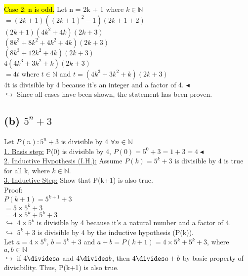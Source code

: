 \documentclass[a4paper, 12pt]{article}
\begin{document}
\hl{Case 2: n is odd.} Let n = 2k + 1 where $k \in \mathbb{N}$\\

$=(2k+1)((2k+1)^2-1)(2k+1+2)$\\
$(2k+1)(4k^2+4k)(2k+3)$\\
$(8k^3+8k^2+4k^2+4k)(2k+3)$\\
$(8k^3+12k^2+4k)(2k+3)$\\
$4(4k^3+3k^2+k)(2k+3)$\\
$=4t$ where $t \in \mathbb{N}$ and $t = (4k^3+3k^2+k)(2k+3)$\\

4t is divisible by 4 because it's an integer and a factor of 4. $\blacktriangleleft$\\

$\hookrightarrow$ Since all cases have been shown, the statement has been proven.


\newpage
\subsection*{(b) $5^n+3$}

Let $P(n): 5^n+3$ is divisible by 4 $\forall n \in \mathbb{N}$\\

\underline{1. Basis step:} P(0) is divisible by 4, $P(0) = 5^0+3 = 1+3 = 4 \blacktriangleleft$\\

\underline{2. Inductive Hypothesis (I.H.):} Assume $P(k)=5^k+3$ is divisible by 4 is true for all k, where $k \in \mathbb{N}$.\\

\underline{3. Inductive Step:} Show that P(k+1) is also true.\\

Proof:\\
$P(k+1)=5^{k+1} + 3$\\
$= 5 \times 5^k + 3$\\
$=4 \times 5^k + 5^k + 3$\\

$\hookrightarrow$ $4\times5^k$ is divisible by 4 because it's a natural number and a factor of 4.\\
$\hookrightarrow$ $5^k+3$ is divisible by 4 by the inductive hypothesis (P(k)).\\

Let $a = 4\times5^k$, $b = 5^k+3$ and $a+b = P(k+1) = 4 \times 5^k + 5^k + 3$, where $a, b \in \mathbb{N}$\\
$\hookrightarrow$ if $4 \divides a$ and $4 \divides b$, then $4 \divides a+b$ by basic property of divisibility. Thus, P(k+1) is also true.\\
\end{document}
